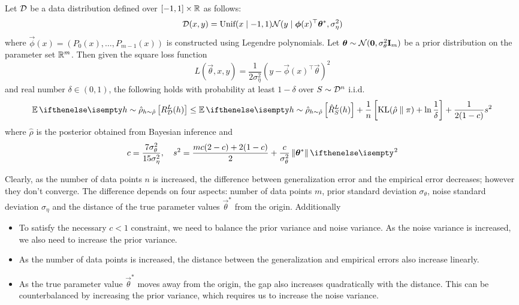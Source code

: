\begin{proposition}
  Let $\mathcal{D}$ be a data distribution defined over $[-1, 1] \times \mathbb{R}$ as follows:
  \begin{equation}
    \mathcal{D}(x, y) = \text{Unif}(x \mid -1, 1) \mathcal{N}(y \mid \bm{\phi}(x)^\top
    \bm{\theta}^*, \sigma_\eta^2)
  \end{equation}
  where $\Vec{\phi}(x) = (P_0(x), \ldots, P_{m - 1}(x))$ is constructed using
  Legendre polynomials. Let $\bm{\theta} \sim \mathcal{N}(\bm{0},
  \sigma_\theta^2 \mathbf{I}_m)$ be a prior distribution on the parameter set
  $\mathbb{R}^m$. Then given the square loss function
  \begin{equation}
    L(\Vec{\theta}, x, y) = \frac{1}{2 \sigma_\eta^2} (y - \Vec{\phi}(x)^\top
    \Vec{\theta})^2
  \end{equation}
  and real number $\delta \in (0, 1)$, the following holds with probability at
  least $1 - \delta$ over $S \sim \mathcal{D}^n$ i.i.d.
  \begin{equation}
    \Ev[h \sim \hat{\rho}]{R_\CD^L(h)} \leq \Ev[h \sim
    \hat{\rho}]{\hat{R}_S^L(h)} + \frac{1}{n}\left[\KL{\hat{\rho}}{\pi} + \ln
    \frac{1}{\delta}\right] + \frac{1}{2 (1 - c)} s^2
  \end{equation}
  where $\hat{\rho}$ is the posterior obtained from Bayesian inference and
  \begin{equation}
    c = \frac{7 \sigma_\theta^2}{15 \sigma_\eta^2}, \quad s^2 = \frac{m c (2 -
    c) + 2 (1 - c)}{2} + \frac{c}{\sigma_\theta^2} \Norm{\Vec{\theta}^*}^2
  \end{equation}
\end{proposition}

Clearly, as the number of data points $n$ is increased, the difference between
generalization error and the empirical error decreases; however they don't
converge. The difference depends on four aspects: number of data points $m$,
prior standard deviation $\sigma_\theta$, noise standard deviation
$\sigma_\eta$ and the distance of the true parameter values $\Vec{\theta}^*$
from the origin. Additionally
\begin{itemize}
  \item
    To satisfy the necessary $c < 1$ constraint, we need to balance the prior
    variance and noise variance. As the noise variance is increased, we also
    need to increase the prior variance.
  \item
    As the number of data points is increased, the distance between the
    generalization and empirical errors also increase linearly.
  \item
    As the true parameter value $\Vec{\theta}^*$ moves away from the origin, the
    gap also increases quadratically with the distance. This can be
    counterbalanced by increasing the prior variance, which requires us to
    increase the noise variance.
\end{itemize}

